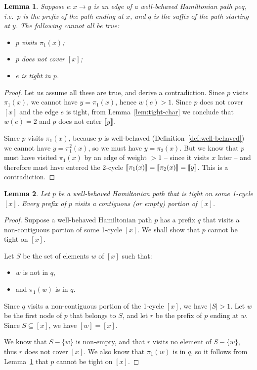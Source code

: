 \documentclass[a4paper]{article}
\newtheorem{lemma}{Lemma}
\theoremstyle{definition}
\theoremstyle{remark}
\begin{document}
\begin{lemma}\label{lem:tight-contra}
Suppose $e: x\to y$ is an edge of a well-behaved Hamiltonian path $peq$, i.e.\ $p$ is the prefix of the path ending at $x$, and $q$ is the suffix of the path starting at $y$. The following cannot all be true:
\begin{itemize}
    \item $p$ visits $\pi_1(x)$;
    \item $p$ does not cover $[x]$;
    \item $e$ is tight in $p$.
\end{itemize}
\end{lemma}
\begin{proof}
    Let us assume all these are true, and derive a contradiction. Since $p$ visits $\pi_1(x)$, we cannot have $y = \pi_1(x)$, hence $w(e) > 1$. Since $p$ does not cover $[x]$ and the edge $e$ is tight, from Lemma~\ref{lem:tight-char} we conclude that $w(e) = 2$ and $p$ does not enter $\llbracket y\rrbracket$.

    Since $p$ visits $\pi_1(x)$, because $p$ is well-behaved (Definition~\ref{def:well-behaved}) we cannot have $y = \pi_1^2(x)$, so we must have $y = \pi_2(x)$. But we know that $p$ must have visited $\pi_1(x)$ by an edge of weight $> 1$ -- since it visits $x$ later -- and therefore must have entered the 2-cycle $\llbracket\pi_1(x)\rrbracket = \llbracket\pi_2(x)\rrbracket = \llbracket y\rrbracket$. This is a contradiction.
\end{proof}

\begin{lemma}\label{lem:contig}
    Let $p$ be a well-behaved Hamiltonian path that is tight on some 1-cycle $[x]$. Every prefix of $p$ visits a contiguous (or empty) portion of $[x]$.
\end{lemma}
\begin{proof}
    Suppose a well-behaved Hamiltonian path $p$ has a prefix $q$ that visits a non-contiguous portion of some 1-cycle $[x]$. We shall show that $p$ cannot be tight on $[x]$.

    Let $S$ be the set of elements $w$ of $[x]$ such that:
    \begin{itemize}
        \item $w$ is not in $q$,
        \item and $\pi_1(w)$ is in $q$.
    \end{itemize}

    Since $q$ visits a non-contiguous portion of the 1-cycle $[x]$, we have $|S| > 1$. Let $w$ be the first node of $p$ that belongs to $S$, and let $r$ be the prefix of $p$ ending at $w$. Since $S\subseteq[x]$, we have $[w]=[x]$.

    We know that $S-\{w\}$ is non-empty, and that $r$ visits no element of $S-\{w\}$, thus $r$ does not cover $[x]$. We also know that $\pi_1(w)$ is in $q$, so it follows from Lemma~\ref{lem:tight-contra} that $p$ cannot be tight on $[x]$.
\end{proof}
\end{document}
